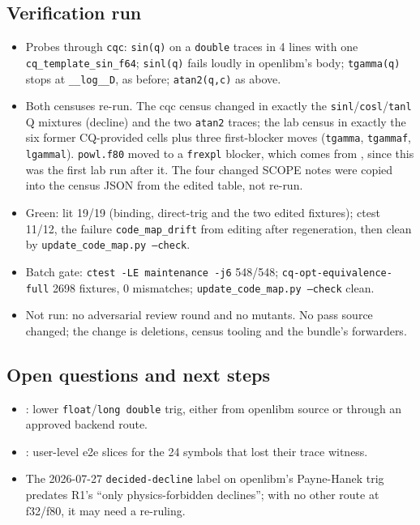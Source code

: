 \subsection*{Verification run}
\begin{itemize}
  \item Probes through \texttt{cqc}: \texttt{sin(q)} on a \texttt{double} traces in 4 lines with one
  \texttt{cq\_template\_sin\_f64}; \texttt{sinl(q)} fails loudly in openlibm's body;
  \texttt{tgamma(q)} stops at \texttt{\_\_log\_\_D}, as before; \texttt{atan2(q,c)} as above.
  \item Both censuses re-run. The cqc census changed in exactly the \texttt{sinl}/\texttt{cosl}/\texttt{tanl}
  Q mixtures (decline) and the two \texttt{atan2} traces; the lab census in exactly the six former
  CQ-provided cells plus three first-blocker moves (\texttt{tgamma}, \texttt{tgammaf},
  \texttt{lgammal}). \texttt{powl.f80} moved to a \texttt{frexpl} blocker, which comes from
  , since this was the first lab run after it. The four changed SCOPE notes were copied
  into the census JSON from the edited table, not re-run.
  \item Green: lit 19/19 (binding, direct-trig and the two edited fixtures); ctest 11/12, the
  failure \texttt{code\_map\_drift} from editing after regeneration, then clean by
  \texttt{update\_code\_map.py --check}.
  \item Batch gate: \texttt{ctest -LE maintenance -j6} 548/548; \texttt{cq-opt-equivalence-full} 2698 fixtures, 0 mismatches; \texttt{update\_code\_map.py --check} clean.
  \item Not run: no adversarial review round and no mutants. No pass source changed; the change is
  deletions, census tooling and the bundle's forwarders.
\end{itemize}

\subsection*{Open questions and next steps}
\begin{itemize}
  \item {}: lower \texttt{float}/\texttt{long double} trig, either from openlibm source
  or through an approved backend route.
  \item {}: user-level e2e slices for the 24 symbols that lost their trace witness.
  \item The 2026-07-27 \texttt{decided-decline} label on openlibm's Payne-Hanek trig predates R1's
  ``only physics-forbidden declines''; with no other route at f32/f80, it may need a re-ruling.
\end{itemize}
